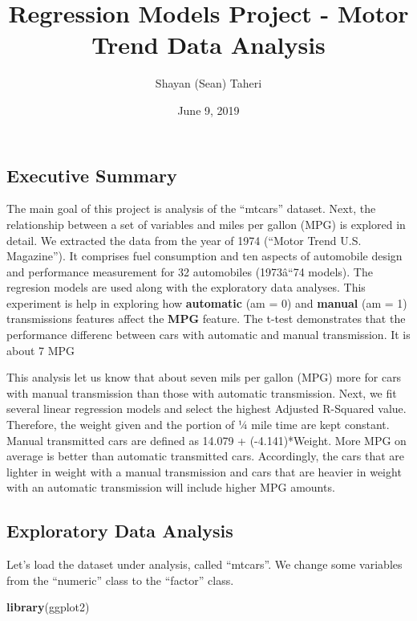 \documentclass[]{article}
\title{Regression Models Project - Motor Trend Data Analysis}
\author{Shayan (Sean) Taheri}
\date{June 9, 2019}
\newenvironment{Shaded}{\begin{snugshade}}{\end{snugshade}}
\newcommand{\KeywordTok}[1]{\textcolor[rgb]{0.13,0.29,0.53}{\textbf{#1}}}
\newcommand{\NormalTok}[1]{#1}
\begin{document}
\maketitle

\subsection{Executive Summary}\label{executive-summary}

The main goal of this project is analysis of the ``mtcars'' dataset.
Next, the relationship between a set of variables and miles per gallon
(MPG) is explored in detail. We extracted the data from the year of 1974
(``Motor Trend U.S. Magazine''). It comprises fuel consumption and ten
aspects of automobile design and performance measurement for 32
automobiles (1973â``74 models). The regresion models are used along
with the exploratory data analyses. This experiment is help in exploring
how \textbf{automatic} (am = 0) and \textbf{manual} (am = 1)
transmissions features affect the \textbf{MPG} feature. The t-test
demonstrates that the performance differenc between cars with automatic
and manual transmission. It is about 7 MPG

This analysis let us know that about seven mils per gallon (MPG) more
for cars with manual transmission than those with automatic
transmission. Next, we fit several linear regression models and select
the highest Adjusted R-Squared value. Therefore, the weight given and
the portion of ¼ mile time are kept constant. Manual transmitted cars
are defined as 14.079 + (-4.141)*Weight. More MPG on average is better
than automatic transmitted cars. Accordingly, the cars that are lighter
in weight with a manual transmission and cars that are heavier in weight
with an automatic transmission will include higher MPG amounts.

\subsection{Exploratory Data Analysis}\label{exploratory-data-analysis}

Let's load the dataset under analysis, called ``mtcars''. We change some
variables from the ``numeric'' class to the ``factor'' class.

\begin{Shaded}
\begin{Highlighting}[]
\KeywordTok{library}\NormalTok{(ggplot2)}
\end{Highlighting}
\end{Shaded}
\end{document}
